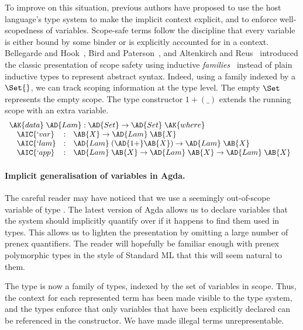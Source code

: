 To improve on this situation, previous authors have proposed to use
the host language's type system to make the implicit context explicit,
and to enforce well-scopedness of variables. Scope-safe terms follow
the discipline that every variable is either bound by some binder or
is explicitly accounted for in a context. Bellegarde and
Hook~\citeyear{BELLEGARDE1994287}, Bird and
Paterson~\citeyear{bird_paterson_1999}, and Altenkirch and
Reus~\citeyear{altenkirch1999monadic} introduced the classic
presentation of scope safety using inductive
\emph{families}~\cite{dybjer1994inductive} instead of plain inductive
types to represent abstract syntax. Indeed, using a family indexed by
a $\Set{}$, we can track scoping information at the type level. The
empty $\Set$ represents the empty scope. The type constructor
$1 + (\_)$ extends the running scope with an extra variable.
\begin{displaymath}
  \begin{array}{l}
    \AK{data}\;\AD{Lam} : \AD{Set} \to \AD{Set}\;\AK{where} \\
    \quad\begin{array}{@{}lll}
           \AIC{`var} &:& \AB{X} \to \AD{Lam}\;\AB{X} \\
           \AIC{`lam} &:& \AD{Lam}\;(\AD{1+} \AB{X}) \to \AD{Lam}\;\AB{X} \\
           \AIC{`app} &:& \AD{Lam}\;\AB{X} \to \AD{Lam}\;\AB{X} \to \AD{Lam}\;\AB{X}
    \end{array}
  \end{array}
\end{displaymath}

\paragraph*{Implicit generalisation of variables in Agda.} The careful
reader may have noticed that we use a seemingly out-of-scope variable
 of type . The latest version of Agda allows us to declare
variables that the system should implicitly quantify over if it happens
to find them used in types. This allows us to lighten the presentation
by omitting a large number of prenex quantifiers. The reader will hopefully
be familiar enough with prenex polymorphic types in the style of Standard ML \cite{defnsml} that this will
seem natural to them.


The  type is now a family of types, indexed by the set
of variables in scope. Thus, the context for each represented term has
been made visible to the type system, and the types enforce that only
variables that have been explicitly declared can be referenced in the
 constructor. We have made illegal terms
unrepresentable.


